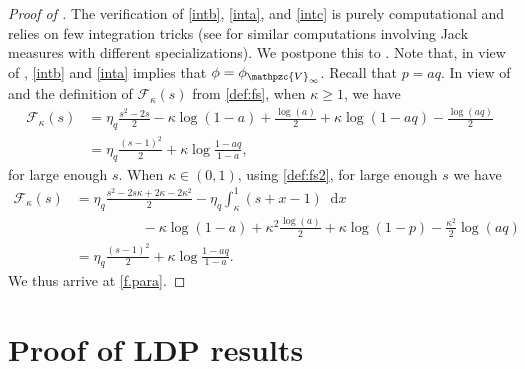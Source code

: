 \documentclass[reqno,11pt]{amsart}
\newcommand{\logq}{\eta_q}
\numberwithin{equation}{section}
\theoremstyle{definition}
\newcommand*\diff{\mathop{}\!\mathrm{d}}
\begin{document}
\begin{proof}[Proof of ]
 The verification of \eqref{intb}, \eqref{inta}, and \eqref{intc} is purely computational and relies on few integration tricks (see \cite[Section 6]{das2022large} for similar computations involving Jack measures with different  specializations).  We postpone this to . Note that, in view of , \eqref{intb} and \eqref{inta} implies that $\phi=\phi_{\mathpzc{V}_\infty}$. Recall that $p=aq$. In view of  and the definition of $\mathcal{F}_\kappa(s)$ from \eqref{def:fs}, when $\kappa \ge 1$, we have
\begin{align*}
    \mathcal{F}_\kappa(s) & =\logq \frac{s^2-2s}{2}-\kappa\log(1-a)+\frac{\log(a)}{2}+\kappa \log(1-aq)-\frac{\log (aq)}{2} \\ & =\logq \frac{(s-1)^2}2+\kappa\log\frac{1-aq}{1-a},
\end{align*}
for large enough $s$. When $\kappa\in (0,1)$, using \eqref{def:fs2}, for large enough $s$ we have
\begin{align*}
    \mathcal{F}_\kappa(s) & =\logq\frac{s^2-2s\kappa+2\kappa-2\kappa^2}{2}-\logq\int_{\kappa}^1 (s+x-1)\diff x \\ & \hspace{2cm}-\kappa\log (1-a)+\kappa^2\frac{\log(a)}{2}+\kappa\log(1-p)-\frac{\kappa^2}2\log (aq) \\ & =\logq \frac{(s-1)^2}2+\kappa\log\frac{1-aq}{1-a}.
\end{align*}
We thus arrive at \eqref{f.para}.
\end{proof}


\section{Proof of LDP results} \label{sec.4}
\end{document}
